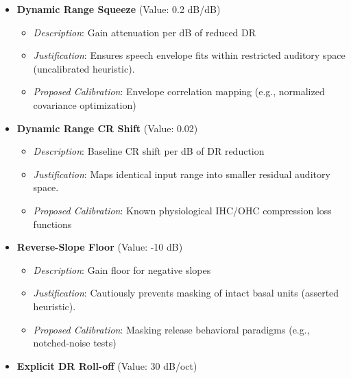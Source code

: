 \documentclass[
  12pt,
]{article}
\providecommand{\tightlist}{%
  \setlength{\itemsep}{0pt}\setlength{\parskip}{0pt}}
\begin{document}
\begin{itemize}
  \begin{itemize}
  \tightlist
  \item
    \emph{Description}: Slope for \(L_{gain}\) soft-compression
  \item
    \emph{Justification}: Gradual restriction for high frequencies
    (asserted heuristic).
  \item
    \emph{Proposed Calibration}: HASPI/HASQI speech-in-noise behavioral
    thresholds (e.g., WIN/HINT)
  \end{itemize}
\item
  \textbf{Dynamic Range Squeeze} (Value: 0.2 dB/dB)

  \begin{itemize}
  \tightlist
  \item
    \emph{Description}: Gain attenuation per dB of reduced DR
  \item
    \emph{Justification}: Ensures speech envelope fits within restricted
    auditory space (uncalibrated heuristic).
  \item
    \emph{Proposed Calibration}: Envelope correlation mapping (e.g.,
    normalized covariance optimization)
  \end{itemize}
\item
  \textbf{Dynamic Range CR Shift} (Value: 0.02)

  \begin{itemize}
  \tightlist
  \item
    \emph{Description}: Baseline CR shift per dB of DR reduction
  \item
    \emph{Justification}: Maps identical input range into smaller
    residual auditory space.
  \item
    \emph{Proposed Calibration}: Known physiological IHC/OHC compression
    loss functions
  \end{itemize}
\item
  \textbf{Reverse-Slope Floor} (Value: -10 dB)

  \begin{itemize}
  \tightlist
  \item
    \emph{Description}: Gain floor for negative slopes
  \item
    \emph{Justification}: Cautiously prevents masking of intact basal
    units (asserted heuristic).
  \item
    \emph{Proposed Calibration}: Masking release behavioral paradigms
    (e.g., notched-noise tests)
  \end{itemize}
\item
  \textbf{Explicit DR Roll-off} (Value: 30 dB/oct)


\end{itemize}
\end{document}
